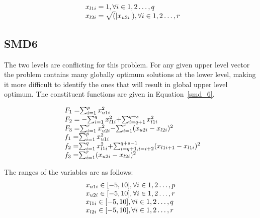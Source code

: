 \begin{equation}
\begin{array}{lr}
\text{}\hspace{2mm} x_{l1i}=1,  \forall i \in {1,2\ldots,q} \\
\text{}\hspace{2mm} x_{l2i}={\sqrt(|x_{u2i}|)} ,  \forall i \in {1,2\ldots,r} \\
\end{array}
\label{basic_5}
\end{equation}


\subsection{SMD6}

The two levels are conflicting for this problem. For any given upper level vector the problem contains many globally optimum solutions at the lower level, making it more difficult to identify the ones that will result in global upper level optimum. The constituent functions are given in Equation~\ref{smd_6}.


\begin{equation}
\begin{array}{lr}
\text{}\hspace{2mm} F_1=$$\sum_{	i=1}^{p} x_{u1i}^{2} $$\\
\text{}\hspace{2mm} F_2=-$$\sum_{	i=1}^{q} x_{l1i}^{2} $$+$$\sum_{	i=q+1}^{q+s} x_{l1i}^{2} $$\\
\text{}\hspace{2mm} F_3=$$\sum_{	i=1}^{r} x_{u2i}^{2} $$-$$\sum_{	i=1}^{r} (x_{u2i}- x_{l2i})^{2} $$\\

\text{}\hspace{2mm} f_1=$$\sum_{	i=1}^{p} x_{u1i}^{2} $$\\
\text{}\hspace{2mm} f_2=$$\sum_{	i=1}^{q} x_{l1i}^{2} $$+$$\sum_{	i=q+1,i=i+2}^{q+s-1} (x_{l1i+1}-x_{l1i})^{2} $$\\
\text{}\hspace{2mm} f_3=$$\sum_{	i=1}^{r} (x_{u2i}- x_{l2i})^{2} $$\\

\end{array}
\label{smd_6}
\end{equation}


The ranges of the variables are as follows:
\begin{equation}
\begin{array}{lr}
$$x_{u1i} \in  [-5,10],          \forall i \in {1,2\ldots,p}$$\\
$$x_{u2i} \in  [-5,10],          \forall i \in {1,2\ldots,r}$$\\
$$x_{l1i} \in  [-5,10],          \forall i \in {1,2\ldots,q}$$\\
$$x_{l2i} \in  [-5,10],          \forall i \in {1,2\ldots,r}$$
\end{array}
\label{smd_6_sub}
\end{equation}


